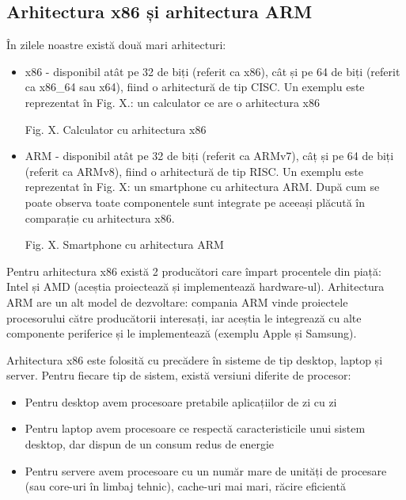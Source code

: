 \subsection{Arhitectura x86 și arhitectura ARM}
\label{sec:hardware-class-arm-x86}

În zilele noastre există două mari arhitecturi:

\begin{itemize}
	\item x86 - disponibil atât pe 32 de biți (referit ca x86), cât și pe 64
		de biți (referit ca x86_64 sau x64), fiind o arhitectură de tip
		CISC. Un exemplu este reprezentat în Fig. X.: un calculator ce
		are o arhitectura x86

Fig. X. Calculator cu arhitectura x86

	\item ARM - disponibil atât pe 32 de biți (referit ca ARMv7), câț și pe
		64 de biți (referit ca ARMv8), fiind o arhitectură de tip RISC.
		Un exemplu este reprezentat în Fig. X: un smartphone cu
		arhitectura ARM. După cum se poate observa toate componentele
		sunt integrate pe aceeași plăcută în comparație cu arhitectura
		x86.

Fig. X. Smartphone cu arhitectura ARM

\end{itemize}

Pentru arhitectura x86 există 2 producători care împart procentele din piață:
Intel și AMD (aceștia proiectează și implementează hardware-ul). Arhitectura ARM
are un alt model de dezvoltare: compania ARM vinde proiectele procesorului către
producătorii interesați, iar aceștia le integrează cu alte componente periferice
și le implementează (exemplu Apple și Samsung).

Arhitectura x86 este folosită cu precădere în sisteme de tip desktop, laptop și
server. Pentru fiecare tip de sistem, există versiuni diferite de procesor:

\begin{itemize}
	\item Pentru desktop avem procesoare pretabile aplicațiilor de zi cu zi
	\item Pentru laptop avem procesoare ce respectă caracteristicile unui
		sistem desktop, dar dispun de un consum redus de energie
	\item Pentru servere avem procesoare cu un număr mare de unități de
		procesare (sau core-uri în limbaj tehnic), cache-uri mai mari,
		răcire eficientă
\end{itemize}

